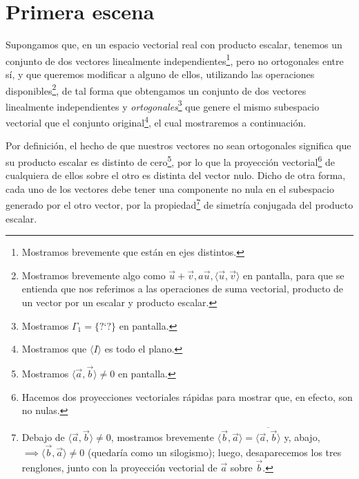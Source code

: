 \documentclass[12pt,dvipsnames]{article}
\numberwithin{equation}{section}
\begin{document}

\newpage
\section{Primera escena}

Supongamos que, en un espacio vectorial real con producto escalar, tenemos un conjunto de dos vectores linealmente independientes\footnote{Mostramos brevemente que están en ejes distintos.}, pero no ortogonales entre sí, y que queremos modificar a alguno de ellos, utilizando las operaciones disponibles\footnote{Mostramos brevemente algo como $\vec{u}+\vec{v}, a\vec{u}, \langle\vec{u},\vec{v}\rangle$ en pantalla, para que se entienda que nos referimos a las operaciones de suma vectorial, producto de un vector por un escalar y producto escalar.}, de tal forma que obtengamos un conjunto de dos vectores linealmente independientes y \emph{ortogonales}\footnote{Mostramos $\Gamma_1=\{ \text{?`} ? \}$ en pantalla.} que genere el mismo subespacio vectorial que el conjunto original\footnote{Mostramos que $\langle I\rangle$ es todo el plano.}, el cual mostraremos a continuación.

Por definición, el hecho de que nuestros vectores no sean ortogonales significa que su producto escalar es distinto de cero\footnote{Mostramos $\langle \vec{a},\vec{b}\rangle\neq0$ en pantalla.}, por lo que la proyección vectorial\footnote{Hacemos dos proyecciones vectoriales rápidas para mostrar que, en efecto, son no nulas.} de cualquiera de ellos sobre el otro es distinta del vector nulo. Dicho de otra forma, cada uno de los vectores debe tener una componente no nula en el subespacio generado por el otro vector, por la propiedad\footnote{Debajo de $\langle\vec{a},\vec{b}\rangle\neq0$, mostramos brevemente $\langle \vec{b},\vec{a}\rangle = \overline{\langle \vec{a},\vec{b}\rangle}$ y, abajo, $\implies \langle\vec{b},\vec{a}\rangle\neq0$ (quedaría como un silogismo); luego, desaparecemos los tres renglones, junto con la proyección vectorial de $\vec{a}$ sobre $\vec{b}$.} de simetría conjugada del producto escalar.
\end{document}
